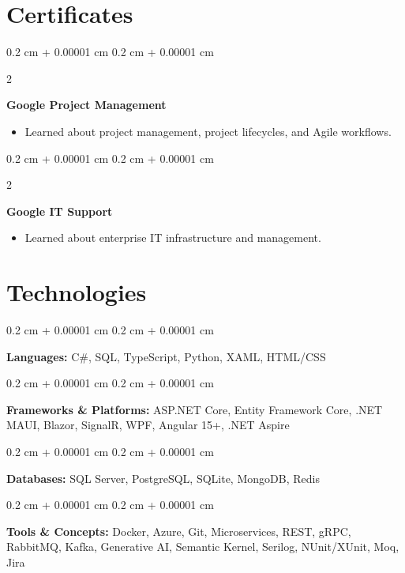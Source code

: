 \documentclass[10pt, letterpaper]{article}
\newenvironment{highlights}{ 
\begin{itemize}[ 
 topsep=0.10 cm, 
 parsep=0.10 cm, 
 partopsep=0pt, 
 itemsep=0pt, 
 leftmargin=0.4 cm + 10pt 
] 
 }{ 
\end{itemize} 
 } %
\newenvironment{onecolentry}{ 
\begin{adjustwidth}{ 
 0.2 cm + 0.00001 cm 
}{ 
 0.2 cm + 0.00001 cm 
} 
 }{ 
\end{adjustwidth} 
 } %
\newenvironment{twocolentry}[2][]{ 
\onecolentry 
\def\secondColumn{#2} 
\setcolumnwidth{\fill, 4.5 cm} 
\begin{paracol}{2} 
 }{ 
\switchcolumn \raggedleft \secondColumn 
\end{paracol} 
\endonecolentry 
 } %
\begin{document}
\section{Certificates} 

 \begin{twocolentry}{\textit{}} 
\textbf{Google Project Management} 
\begin{highlights} 
 \item Learned about project management, project lifecycles, and Agile workflows. 
\end{highlights} 
 \end{twocolentry} 

 \vspace{0.1 cm} 
 \begin{twocolentry}{\textit{}} 
\textbf{Google IT Support} 
\begin{highlights} 
 \item Learned about enterprise IT infrastructure and management. 
\end{highlights} 
 \end{twocolentry} 

\section{Technologies} 

 \begin{onecolentry} 
\textbf{Languages:} C\#, SQL, TypeScript, Python, XAML, HTML/CSS 
 \end{onecolentry} 

 \vspace{0.2 cm} 

 \begin{onecolentry} 
\textbf{Frameworks \& Platforms:} ASP.NET Core, Entity Framework Core, .NET MAUI, Blazor, SignalR, WPF, Angular 15+, .NET Aspire 
 \end{onecolentry} 

 \vspace{0.2 cm} 

 \begin{onecolentry} 
\textbf{Databases:} SQL Server, PostgreSQL, SQLite, MongoDB, Redis 
 \end{onecolentry} 

 \vspace{0.2 cm} 

 \begin{onecolentry} 
\textbf{Tools \& Concepts:} Docker, Azure, Git, Microservices, REST, gRPC, RabbitMQ, Kafka, Generative AI, Semantic Kernel, Serilog, NUnit/XUnit, Moq, Jira 
 \end{onecolentry} 

 
\end{document}
